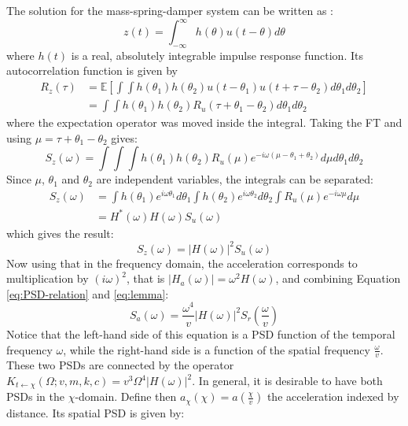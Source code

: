 The solution for the mass-spring-damper system can be written as \cite{newland2005introduction}:
\begin{equation}
    z(t) = \int_{-\infty}^{\infty} h(\theta) u(t - \theta) d\theta
\end{equation}
where $h(t)$ is a real, absolutely integrable impulse response function. Its autocorrelation function is given by
\begin{align}
    R_z(\tau) &= \mathbb{E}\left[\int \int h(\theta_1) h(\theta_2) u(t - \theta_1) u(t + \tau - \theta_2) d\theta_1 d\theta_2\right] \nonumber\\
              &= \int \int h(\theta_1) h(\theta_2) R_u(\tau + \theta_1 - \theta_2) d\theta_1 d\theta_2 
\end{align}
where the expectation operator was moved inside the integral. Taking the FT and using $\mu = \tau + \theta_1 - \theta_2$ gives:
\begin{equation}
    S_z(\omega) = \int \int \int h(\theta_1) h(\theta_2) R_u(\mu) e^{-i\omega(\mu - \theta_1 + \theta_2)} d\mu d\theta_1 d\theta_2
\end{equation}
Since $\mu$, $\theta_1$ and $\theta_2$ are independent variables, the integrals can be separated:
\begin{align}
    S_z(\omega) &= \int h(\theta_1) e^{i\omega \theta_1} d\theta_1 \int h(\theta_2) e^{i\omega \theta_2} d\theta_2 \int R_u(\mu) e^{-i\omega\mu} d\mu  \nonumber \\
                &= H^*(\omega) H(\omega) S_u(\omega)
\end{align}
which gives the result:
\begin{equation}
    S_z(\omega) = |H(\omega)|^2 S_u(\omega)
    \label{eq:PSD-relation}
\end{equation}
Now using that in the frequency domain, the acceleration corresponds to multiplication by $(i\omega)^2$, that is $|H_a(\omega)|=\omega^2 H(\omega)$, and combining Equation \ref{eq:PSD-relation} and \ref{eq:lemma}:
\begin{equation}
    S_{a}(\omega) = \frac{\omega^4}{v}|H(\omega)|^2 S_r\left(\frac{\omega}{v}\right)
    \label{eq:acceleration-temporal-PSD}
\end{equation}
Notice that the left-hand side of this equation is a PSD function of the temporal frequency $\omega$, while the right-hand side is a function of the spatial frequency $\frac{\omega}{v}$. These two PSDs are connected by the operator $K_{t \leftarrow \chi}(\Omega;v,m,k,c) = v^3 \Omega^4|H(\omega)|^2$. In general, it is desirable to have both PSDs in the $\chi$-domain. Define then $a_\chi(\chi) = a(\frac{\chi}{v})$ the acceleration indexed by distance. Its spatial PSD is given by:
